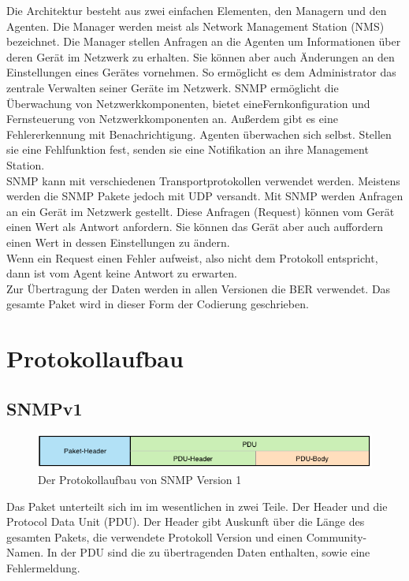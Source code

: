 \documentclass[11pt,a4paper]{article}
\begin{document}
Die Architektur besteht aus zwei einfachen Elementen, den Managern und den Agenten. Die Manager werden meist als Network Management Station (NMS) bezeichnet. Die Manager stellen Anfragen an die Agenten um Informationen über deren Gerät im Netzwerk zu erhalten. Sie können aber auch Änderungen an den Einstellungen eines Gerätes vornehmen. So ermöglicht es dem Administrator das zentrale Verwalten seiner Geräte im Netzwerk.
SNMP ermöglicht die Überwachung von Netzwerkkomponenten, bietet eineFernkonfiguration und Fernsteuerung von Netzwerkkomponenten an. Außerdem gibt es eine Fehlererkennung mit Benachrichtigung. Agenten überwachen sich selbst. Stellen sie eine Fehlfunktion fest, senden sie eine Notifikation an ihre Management Station.\\
SNMP kann mit verschiedenen Transportprotokollen verwendet werden. Meistens werden die SNMP Pakete jedoch mit UDP versandt.
Mit SNMP werden Anfragen an ein Gerät im Netzwerk gestellt. Diese Anfragen (Request) können vom Gerät einen Wert als Antwort anfordern. Sie können das Gerät aber auch auffordern einen Wert in dessen Einstellungen zu ändern.\\
Wenn ein Request einen Fehler aufweist, also nicht dem Protokoll entspricht, dann ist vom Agent keine Antwort zu erwarten.\\
Zur Übertragung der Daten werden in allen Versionen die BER verwendet. Das gesamte Paket wird in dieser Form der Codierung geschrieben.
\\

\section{Protokollaufbau}
\subsection{SNMPv1}
\begin{figure}[h]
	\centering
	\includegraphics[scale=1]{Bilder/SNMPv1-Aufbau}
	\caption{Der Protokollaufbau von SNMP Version 1}
\end{figure}
Das Paket unterteilt sich im im wesentlichen in zwei Teile. Der Header und die Protocol Data Unit (PDU). Der Header gibt Auskunft über die Länge des gesamten Pakets, die verwendete Protokoll Version und einen Community-Namen. In der PDU sind die zu übertragenden Daten enthalten, sowie eine Fehlermeldung.\\
\end{document}
